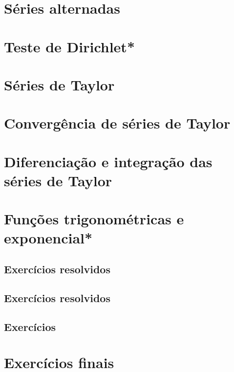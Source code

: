 \section{Séries alternadas}
\construirSec

\section{Teste de Dirichlet*}
\construirSec

\section{Séries de Taylor}
\construirSec

\section{Convergência de séries de Taylor}
\construirSec

\section{Diferenciação e integração das séries de Taylor}
\construirSec

\section{Funções trigonométricas e exponencial*}
\construirSec

\subsection*{Exercícios resolvidos}

\construirExeresol


\subsection*{Exercícios resolvidos}

\construirExeresol


\subsection*{Exercícios}

\construirExer

\section{Exercícios finais}

\construirExer



